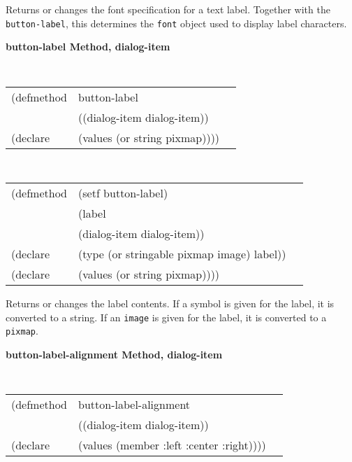 \begin{flushright} \parbox[t]{6.125in}{
Returns or changes the font specification for a text label. Together
with the {\tt button-label}, this determines the {\tt font}
object used to display label characters.
}
\end{flushright}




{\samepage  
{\large {\bf button-label \hfill Method, dialog-item}}
\begin{flushright} \parbox[t]{6.125in}{
\tt
\begin{tabular}{lll}
\raggedright
(defmethod & button-label & \\
& ((dialog-item  dialog-item)) \\
(declare & (values (or string pixmap))))
\end{tabular}
\rm

}\end{flushright}}

\begin{flushright} \parbox[t]{6.125in}{
\tt
\begin{tabular}{lll}
\raggedright
(defmethod & (setf button-label) & \\
         & (label \\
         & (dialog-item  dialog-item)) \\
(declare &(type (or stringable pixmap image)  label))\\
(declare & (values (or string pixmap))))
\end{tabular}
\rm}
\end{flushright}

\begin{flushright} \parbox[t]{6.125in}{
Returns or changes the label contents. If a symbol is given for the label, it is
converted to a string. If an {\tt image} is given for the label, it is converted
to a {\tt pixmap}.} \end{flushright}

{\samepage  
{\large {\bf button-label-alignment \hfill Method, dialog-item}}
\begin{flushright} \parbox[t]{6.125in}{
\tt
\begin{tabular}{lll}
\raggedright
(defmethod & button-label-alignment & \\
& ((dialog-item  dialog-item)) \\
(declare & (values (member :left :center :right))))
\end{tabular}
\rm

}\end{flushright}}

